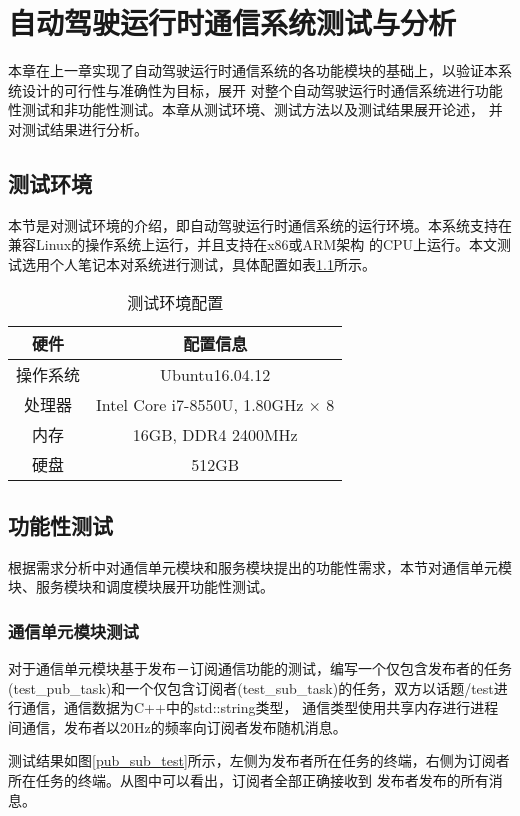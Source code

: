 \chapter{自动驾驶运行时通信系统测试与分析}
本章在上一章实现了自动驾驶运行时通信系统的各功能模块的基础上，以验证本系统设计的可行性与准确性为目标，展开
对整个自动驾驶运行时通信系统进行功能性测试和非功能性测试。本章从测试环境、测试方法以及测试结果展开论述，
并对测试结果进行分析。

\section{测试环境}
本节是对测试环境的介绍，即自动驾驶运行时通信系统的运行环境。本系统支持在兼容Linux的操作系统上运行，并且支持在x86或ARM架构
的CPU上运行。本文测试选用个人笔记本对系统进行测试，具体配置如表\ref{test_env}所示。
\begin{table}[htb]
  \centering\small
  \renewcommand\arraystretch{1.2}
  \caption{测试环境配置}
  \label{test_env}
  \begin{tabular}{cc}
    \toprule
    硬件 & 配置信息 \\
    \midrule
    操作系统 & Ubuntu16.04.12\\
    处理器 & Intel Core i7-8550U, 1.80GHz $\times$ 8\\
    内存 & 16GB, DDR4 2400MHz\\
    硬盘 & 512GB\\
    \bottomrule
  \end{tabular}
\end{table}
    
\section{功能性测试}
根据需求分析中对通信单元模块和服务模块提出的功能性需求，本节对通信单元模块、服务模块和调度模块展开功能性测试。
\subsection{通信单元模块测试}
对于通信单元模块基于发布－订阅通信功能的测试，编写一个仅包含发布者的任务(test\_pub\_task)和一个仅包含订阅者(test\_sub\_task)的任务，双方以话题/test进行通信，通信数据为C++中的std::string类型，
通信类型使用共享内存进行进程间通信，发布者以20Hz的频率向订阅者发布随机消息。

测试结果如图\ref{pub_sub_test}所示，左侧为发布者所在任务的终端，右侧为订阅者所在任务的终端。从图中可以看出，订阅者全部正确接收到
发布者发布的所有消息。

